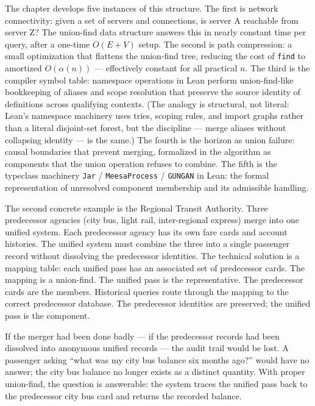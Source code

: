 \begin{chapteressay}
The chapter develops five instances of this structure. The first is
network connectivity: given a set of servers and connections, is
server A reachable from server Z? The union-find data structure
answers this in nearly constant time per query, after a one-time
$O(E + V)$ setup. The second is path compression: a small optimization
that flattens the union-find tree, reducing the cost of \texttt{find}
to amortized $O(\alpha(n))$ --- effectively constant for all practical
$n$. The third is the compiler symbol table: namespace operations in
Lean perform union-find-like bookkeeping of aliases and scope
resolution that preserve the source identity of definitions across
qualifying contexts. (The analogy is structural, not literal: Lean's
namespace machinery uses tries, scoping rules, and import graphs
rather than a literal disjoint-set forest, but the discipline ---
merge aliases without collapsing identity --- is the same.) The
fourth is the horizon as
union failure: causal boundaries that prevent merging, formalized in
the algorithm as components that the union operation refuses to
combine. The fifth is the typeclass machinery \texttt{Jar} /
\texttt{MeesaProcess} / \texttt{GUNGAN} in Lean: the formal
representation of unresolved component membership and its admissible
handling.

The second concrete example is the Regional Transit Authority. Three
predecessor agencies (city bus, light rail, inter-regional express)
merge into one unified system. Each predecessor agency has its own
fare cards and account histories. The unified system must combine
the three into a single passenger record without dissolving the
predecessor identities. The technical solution is a mapping table:
each unified pass has an associated set of predecessor cards. The
mapping is a union-find. The unified pass is the representative.
The predecessor cards are the members. Historical queries route
through the mapping to the correct predecessor database. The
predecessor identities are preserved; the unified pass is the
component.

If the merger had been done badly --- if the predecessor records had
been dissolved into anonymous unified records --- the audit trail
would be lost. A passenger asking ``what was my city bus balance
six months ago?'' would have no answer; the city bus balance no
longer exists as a distinct quantity. With proper union-find, the
question is answerable: the system traces the unified pass back to
the predecessor city bus card and returns the recorded balance.


\end{chapteressay}
